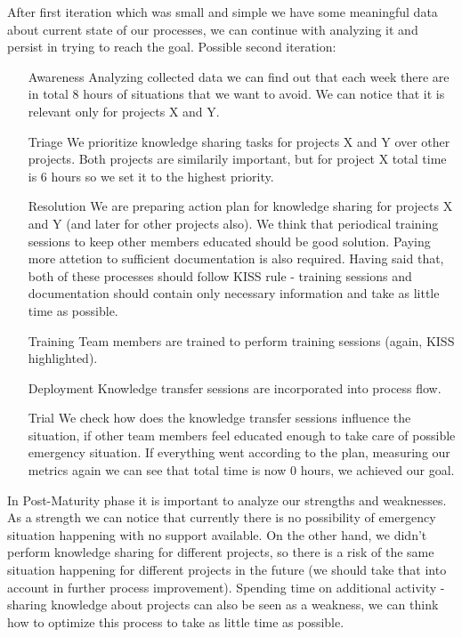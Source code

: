 After first iteration which was small and simple we have some meaningful data about current state of our processes, we can continue with analyzing it and persist in trying to reach the goal. Possible second iteration:
\begin{enumerate}
\item[Awareness] Analyzing collected data we can find out that each week there are in total 8 hours of situations that we want to avoid. We can notice that it is relevant only for projects X and Y.
\item[Triage] We prioritize knowledge sharing tasks for projects X and Y over other projects. Both projects are similarily important, but for project X total time is 6 hours so we set it to the highest priority.
\item[Resolution] We are preparing action plan for knowledge sharing for projects X and Y (and later for other projects also). We think that periodical training sessions to keep other members educated should be good solution. Paying more attetion to sufficient documentation is also required. Having said that, both of these processes should follow KISS rule - training sessions and documentation should contain only necessary information and take as little time as possible.  
\item[Training] Team members are trained to perform training sessions (again, KISS highlighted).
\item[Deployment] Knowledge transfer sessions are incorporated into process flow.
\item[Trial] We check how does the knowledge transfer sessions influence the situation, if other team members feel educated enough to take care of possible emergency situation. If everything went according to the plan, measuring our metrics again we can see that total time is now 0 hours, we achieved our goal.
\end{enumerate}

In Post-Maturity phase it is important to analyze our strengths and weaknesses. As a strength we can notice that currently there is no possibility of emergency situation happening with no support available. On the other hand, we didn't perform knowledge sharing for different projects, so there is a risk of the same situation happening for different projects in the future (we should take that into account in further process improvement). Spending time on additional activity - sharing knowledge about projects can also be seen as a weakness, we can think how to optimize this process to take as little time as possible.
